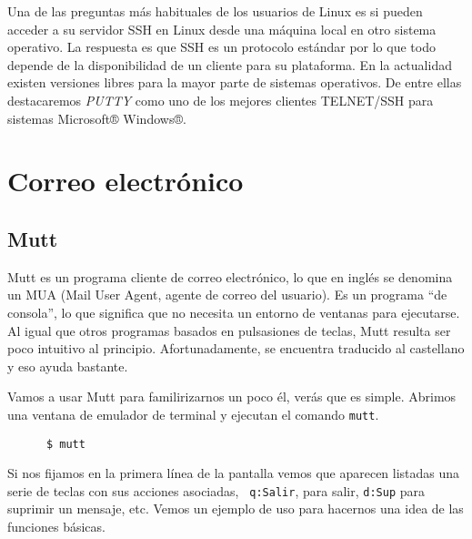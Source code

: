 Una de  las preguntas más  habituales de los  usuarios de Linux  es si
pueden acceder a  su servidor SSH en Linux desde  una máquina local en
otro  sistema operativo.  La  respuesta  es que  SSH  es un  protocolo
estándar por  lo que todo depende  de la disponibilidad de  un cliente
para su plataforma. En la  actualidad existen versiones libres para la
mayor  parte  de  sistemas  operativos. De  entre  ellas  destacaremos
{\em  PUTTY} %
como uno  de los  mejores clientes
TELNET/SSH para sistemas Microsoft® Windows®.


\section{Correo electrónico}

\subsection{Mutt }


{\sf Mutt}  es un programa  cliente de  correo electrónico, lo  que en
inglés  se denomina  un MUA  (Mail User  Agent, agente  de correo  del
usuario).  Es un  programa ``de  consola'',  lo que  significa que  no
necesita un  entorno de ventanas  para ejecutarse. Al igual  que otros
programas basados  en pulsasiones  de teclas,  {\sf Mutt}  resulta ser
poco intuitivo  al principio. Afortunadamente, se  encuentra traducido
al castellano y eso ayuda bastante.

Vamos a usar  {\sf Mutt} para familirizarnos un poco  él, verás que es
simple.  Abrimos una  ventana de  emulador de  terminal y  ejecutan el
comando {\tt mutt}.

\begin{verbatim}
      $ mutt
\end{verbatim}

Si nos fijamos  en la primera línea de la  pantalla vemos que aparecen
listadas  una  serie  de  teclas  con  sus  acciones  asociadas,  {\tt
q:Salir}, para salir, {\tt d:Sup} para suprimir un mensaje, etc. Vemos
un ejemplo de uso para hacernos una idea de las funciones básicas.

% 
 

